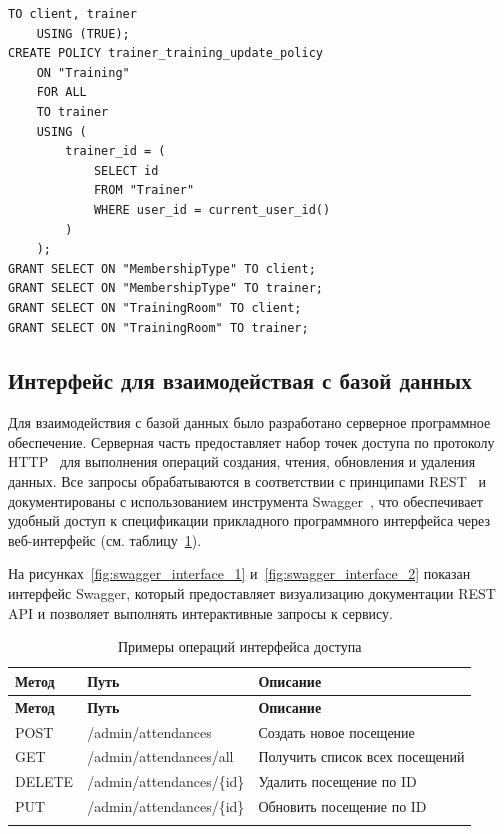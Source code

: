 \newpage
\begin{lstlisting}[label=alg:35, caption=Реализация ролей Client (клиент) и Trainer (тренер) -- конец, captionpos=t]
	TO client, trainer
	USING (TRUE);
CREATE POLICY trainer_training_update_policy
	ON "Training"
	FOR ALL
	TO trainer
	USING (
		trainer_id = (
			SELECT id 
			FROM "Trainer"
			WHERE user_id = current_user_id()
		)
	);
GRANT SELECT ON "MembershipType" TO client;
GRANT SELECT ON "MembershipType" TO trainer;
GRANT SELECT ON "TrainingRoom" TO client;
GRANT SELECT ON "TrainingRoom" TO trainer;
\end{lstlisting}

\subsection{Интерфейс для взаимодействая с базой данных}

Для взаимодействия с базой данных было разработано серверное программное обеспечение. Серверная часть предоставляет набор точек доступа по протоколу HTTP~\cite{HTTP_RFC7230} для выполнения операций создания, чтения, обновления и удаления данных. Все запросы обрабатываются в соответствии с принципами REST~\cite{Fielding2000} и документированы с использованием инструмента Swagger~\cite{Swagger}, что обеспечивает удобный доступ к спецификации прикладного программного интерфейса через веб-интерфейс (см. таблицу~\ref{tab:api-operations}).

На рисунках~\ref{fig:swagger_interface_1} и~\ref{fig:swagger_interface_2} показан интерфейс Swagger, который предоставляет визуализацию документации REST API и позволяет выполнять интерактивные запросы к сервису.

\begin{longtable}{|p{2cm}|p{7cm}|p{6cm}|}
	\hline
	\textbf{Метод} & \textbf{Путь} & \textbf{Описание} \\
	\hline
	\endfirsthead
	\hline
	\textbf{Метод} & \textbf{Путь} & \textbf{Описание} \\
	\hline
	\endhead
	\hline
	POST & /admin/attendances & Создать новое посещение \\
	\hline
	GET & /admin/attendances/all & Получить список всех посещений \\
	\hline
	DELETE & /admin/attendances/\{id\} & Удалить посещение по ID \\
	\hline
	PUT & /admin/attendances/\{id\} &  Обновить посещение по ID \\
	\hline
	\caption{Примеры операций интерфейса доступа}
	\label{tab:api-operations} 
\end{longtable}

